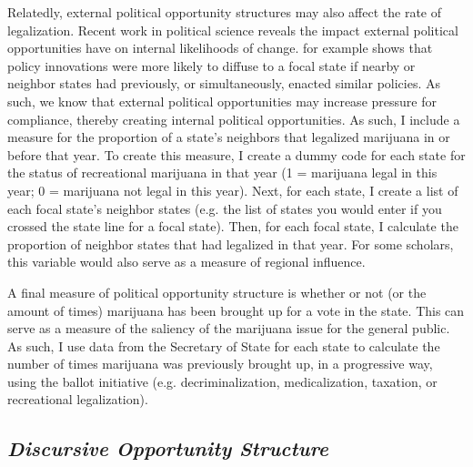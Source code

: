 Relatedly, external political opportunity structures may also affect the rate of legalization. Recent work in political science reveals the impact external political opportunities have on internal likelihoods of change. \citet{boushey_2016} for example shows that policy innovations were more likely to diffuse to a focal state if nearby or neighbor states had previously, or simultaneously, enacted similar policies. As such, we know that external political opportunities may increase pressure for compliance, thereby creating internal political opportunities. As such, I include a measure for the proportion of a state's neighbors that legalized marijuana in or before that year. To create this measure, I create a dummy code for each state for the status of recreational marijuana in that year (1 = marijuana legal in this year; 0 = marijuana not legal in this year). Next, for each state, I create a list of each focal state's neighbor states (e.g. the list of states you would enter if you crossed the state line for a focal state). Then, for each focal state, I calculate the proportion of neighbor states that had legalized in that year. For some scholars, this variable would also serve as a measure of regional influence.

A final measure of political opportunity structure is whether or not (or the amount of times) marijuana has been brought up for a vote in the state. This can serve as a measure of the saliency of the marijuana issue for the general public. As such, I use data from the Secretary of State for each state to calculate the number of times marijuana was previously brought up, in a progressive way, using the ballot initiative (e.g. decriminalization, medicalization, taxation, or recreational legalization). 



\subsection{\it{Discursive Opportunity Structure}}

